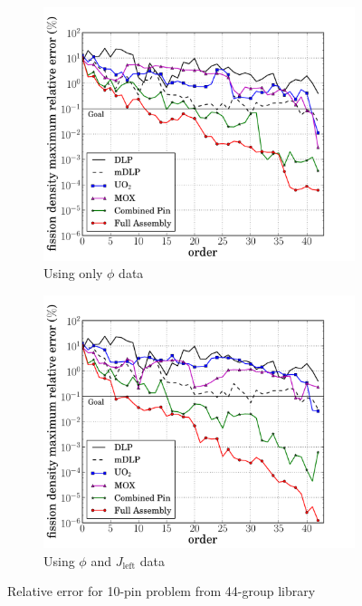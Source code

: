\documentclass[5p,times,twocolumn,10pt]{elsarticle}
\begin{document}
    \begin{figure}[tb]
        \centering
        \begin{subfigure}{0.5\textwidth}
            \centering
            \includegraphics[trim=.1cm .25cm 2.0cm .4cm, clip=true,
            totalheight=0.261\textheight]
            {10pin_44_energy_basis_comparison_fission-44}
            \caption{Using only $\phi$ data}
            \label{fig:10pin-44a}
        \end{subfigure}%
        \begin{subfigure}{0.5\textwidth}
            \centering
            \includegraphics[trim=.1cm .25cm 2.0cm .4cm, clip=true,
            totalheight=0.261\textheight]
            {10pin_44_partial_energy_basis_comparison_fission-44}
            \caption{Using $\phi$ and $J_{\text{left}}$ data}
            \label{fig:10pin-44b}
        \end{subfigure}
        \caption{Relative error for 10-pin problem from 44-group library}
        \label{fig:10pin-44}
    \end{figure}
\end{document}
